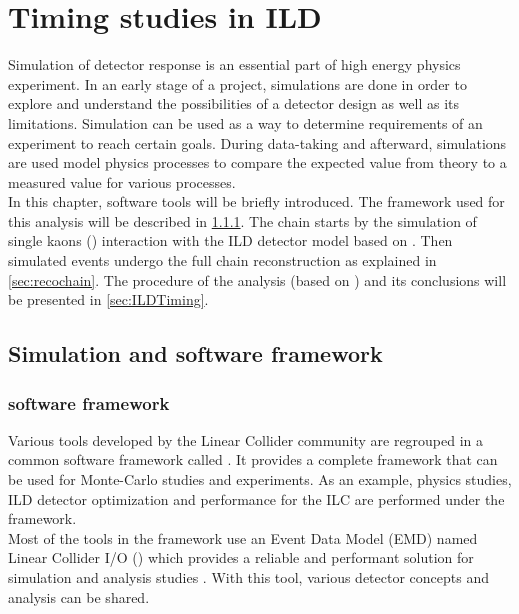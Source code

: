 \chapter{Timing studies in ILD}

Simulation of detector response is an essential part of high energy physics experiment. In an early stage of a project, simulations are done in order to explore and understand the possibilities of a detector design as well as its limitations. Simulation can be used as a way to determine requirements of an experiment to reach certain goals. During data-taking and afterward, simulations are used model physics processes to compare the expected value from theory to a measured value for various processes.\\

In this chapter, software tools will be briefly introduced. The \ilcsoft framework used for this analysis will be described in \ref{sec:ILCSoft}. The chain starts by the simulation of single kaons (\kzeroL) interaction with the ILD detector model based on \geant. Then simulated events undergo the full chain reconstruction as explained in \ref{sec:recochain}. The procedure of the analysis (based on \marlin) and its conclusions will be presented in \ref{sec:ILDTiming}.

\section{Simulation and software framework}

\subsection{\ilcsoft software framework}
\label{sec:ILCSoft}

Various tools developed by the Linear Collider community are regrouped in a common software framework called \ilcsoft \cite{ILCSoftPortal}. It provides a complete framework that can be used for Monte-Carlo studies and experiments. As an example, physics studies, ILD detector optimization and performance for the ILC are performed under the \ilcsoft framework.\\

Most of the tools in the framework use an Event Data Model (EMD) named Linear Collider I/O (\lcio) which provides a reliable and performant solution for simulation and analysis studies \cite{Gaede:2003ip}. With this tool, various detector concepts and analysis can be shared.

